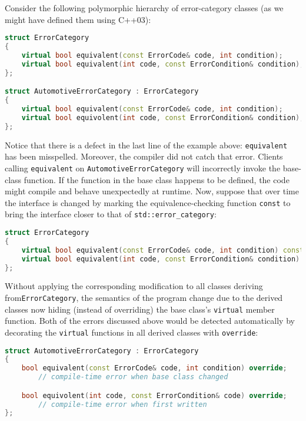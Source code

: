 Consider the following polymorphic hierarchy of error-category classes
(as we might have defined them using C++03):

\begin{lstlisting}[language=C++]
struct ErrorCategory
{
    virtual bool equivalent(const ErrorCode& code, int condition);
    virtual bool equivalent(int code, const ErrorCondition& condition);
};

struct AutomotiveErrorCategory : ErrorCategory
{
    virtual bool equivalent(const ErrorCode& code, int condition);
    virtual bool equivolent(int code, const ErrorCondition& condition);
};
\end{lstlisting}
    
\noindent Notice that there is a defect in the last line of the example above:
\texttt{equivalent} has been misspelled. Moreover, the compiler did not
catch that error. Clients calling \texttt{equivalent} on
\texttt{AutomotiveErrorCategory} will incorrectly invoke the base-class
function. If the function in the base class happens to be defined, the
code might compile and behave unexpectedly at runtime. Now, suppose
that over time the interface is changed by marking the
equivalence-checking function \texttt{const} to bring the interface
closer to that of \texttt{std::error\_category}:

\begin{lstlisting}[language=C++]
struct ErrorCategory
{
    virtual bool equivalent(const ErrorCode& code, int condition) const;
    virtual bool equivalent(int code, const ErrorCondition& condition) const;
};
\end{lstlisting}
    
Without applying the corresponding modification to all classes deriving
from\linebreak[4] \texttt{ErrorCategory}, the semantics of the program change due to
the derived classes now hiding (instead of overriding) the base class's
\texttt{virtual} member function. Both of the errors discussed above
would be detected automatically by decorating the \texttt{virtual}
functions in all derived classes with \texttt{override}:

\begin{lstlisting}[language=C++]
struct AutomotiveErrorCategory : ErrorCategory
{
    bool equivalent(const ErrorCode& code, int condition) override;
        // compile-time error when base class changed

    bool equivolent(int code, const ErrorCondition& code) override;
        // compile-time error when first written
};
\end{lstlisting}
    
